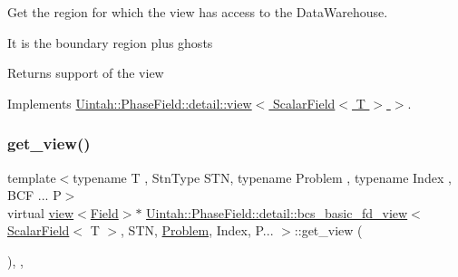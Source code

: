 Get the region for which the view has access to the Data\+Warehouse. 

It is the boundary region plus ghosts

\begin{DoxyReturn}{Returns}
support of the view 
\end{DoxyReturn}


Implements \hyperlink{classUintah_1_1PhaseField_1_1detail_1_1view_3_01ScalarField_3_01T_01_4_01_4_a3e14b0c7a57a57707bb33954861ab1c1}{Uintah\+::\+Phase\+Field\+::detail\+::view$<$ Scalar\+Field$<$ T $>$ $>$}.

\mbox{\label{classUintah_1_1PhaseField_1_1detail_1_1bcs__basic__fd__view_3_01ScalarField_3_01T_01_4_00_01STN_07caa9955adf783da0505eac75e76f08_a1c51fe0d64605df5ce9c757681eb80a5}} 
\subsubsection{\texorpdfstring{get\+\_\+view()}{get\_view()}\hspace{0.1cm}{\footnotesize\ttfamily [1/2]}}
{\footnotesize\ttfamily template$<$typename T , Stn\+Type S\+TN, typename Problem , typename Index , B\+C\+F ... P$>$ \\
virtual \hyperlink{classUintah_1_1PhaseField_1_1detail_1_1view}{view}$<$\hyperlink{structUintah_1_1PhaseField_1_1ScalarField}{Field}$>$$\ast$ \hyperlink{classUintah_1_1PhaseField_1_1detail_1_1bcs__basic__fd__view}{Uintah\+::\+Phase\+Field\+::detail\+::bcs\+\_\+basic\+\_\+fd\+\_\+view}$<$ \hyperlink{structUintah_1_1PhaseField_1_1ScalarField}{Scalar\+Field}$<$ T $>$, S\+TN, \hyperlink{classUintah_1_1PhaseField_1_1Problem}{Problem}, Index, P... $>$\+::get\+\_\+view (\begin{DoxyParamCaption}{ }\end{DoxyParamCaption})\hspace{0.3cm}{\ttfamily [inline]}, {\ttfamily [override]}, {\ttfamily [virtual]}}



